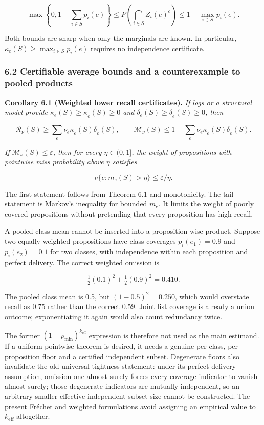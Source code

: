 \documentclass[
  11pt]{article}
\begin{document}
\[\max\left\{0,1-\sum_{i\in S}p_i(e)\right\}\le P\!\left(\bigcap_{i\in S}Z_i(e)^c\right)\le1-\max_{i\in S}p_i(e).\]

Both bounds are sharp when only the marginals are known. In particular,
\(\kappa_e(S)\ge\max_{i\in S}p_i(e)\) requires no independence
certificate.

\subsubsection{6.2 Certifiable average bounds and a counterexample to
pooled
products}\label{certifiable-average-bounds-and-a-counterexample-to-pooled-products}

\textbf{Corollary 6.1 (Weighted lower recall certificates).} \emph{If
logs or a structural model provide
\(\kappa_e(S)\ge\underline\kappa_e(S)\ge0\) and
\(\delta_e(S)\ge\underline\delta_e(S)\ge0\), then}

\[\mathcal R_\nu(S)\ge\sum_e\nu_e\underline\kappa_e(S)\underline\delta_e(S),\qquad
\mathcal M_\nu(S)\le1-\sum_e\nu_e\underline\kappa_e(S)\underline\delta_e(S).\]

\emph{If \(\mathcal M_\nu(S)\le\varepsilon\), then for every
\(\eta\in(0,1]\), the weight of propositions with pointwise miss
probability above \(\eta\) satisfies}

\[\nu\{e:m_e(S)>\eta\}\le\varepsilon/\eta.\]

The first statement follows from Theorem 6.1 and monotonicity. The tail
statement is Markov's inequality for bounded \(m_e\). It limits the
weight of poorly covered propositions without pretending that every
proposition has high recall.

A pooled class mean cannot be inserted into a proposition-wise product.
Suppose two equally weighted propositions have class-coverages
\(p_i(e_1)=0.9\) and \(p_i(e_2)=0.1\) for two classes, with independence
within each proposition and perfect delivery. The correct weighted
omission is

\[\tfrac12(0.1)^2+\tfrac12(0.9)^2=0.410.\]

The pooled class mean is 0.5, but \((1-0.5)^2=0.250\), which would
overstate recall as 0.75 rather than the correct 0.59. Joint list
coverage is already a union outcome; exponentiating it again would also
count redundancy twice.

The former \((1-p_{\min})^{k_{\mathrm{eff}}}\) expression is therefore
not used as the main estimand. If a uniform pointwise theorem is
desired, it needs a genuine per-class, per-proposition floor and a
certified independent subset. Degenerate floors also invalidate the old
universal tightness statement: under its perfect-delivery assumption,
omission one almost surely forces every coverage indicator to vanish
almost surely; those degenerate indicators are mutually independent, so
an arbitrary smaller effective independent-subset size cannot be
constructed. The present Fréchet and weighted formulations avoid
assigning an empirical value to \(k_{\mathrm{eff}}\) altogether.
\end{document}
